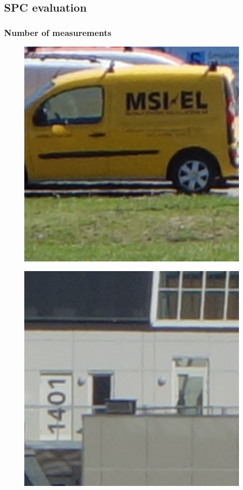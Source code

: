 

\subsection{SPC evaluation}
\label{sec:eval_spc}

\subsubsection{Number of measurements}
\begin{figure}[H]
\begin{minipage}[t]{0.3\linewidth} %
	\includegraphics[width = 1\linewidth]{gfx/car/car_org.png}
	\label{fig:car_org}
\end{minipage}
\begin{minipage}[t]{0.3\linewidth} %
	\includegraphics[width = 1\linewidth]{gfx/hus/hus_org.png}

\end{minipage}
\end{figure}
